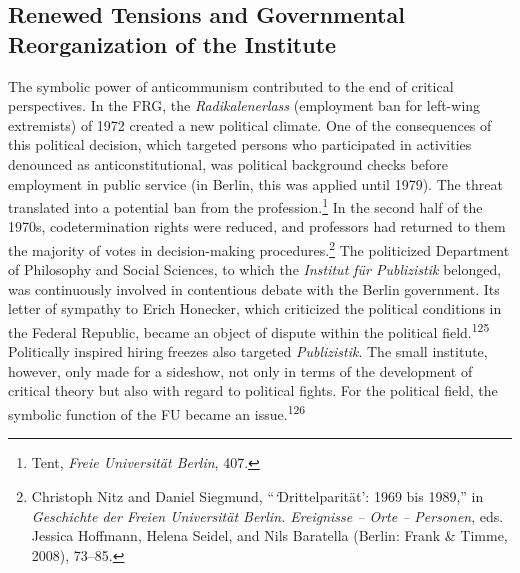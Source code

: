 \documentclass{tufte-handout}
\begin{document}
\hypertarget{renewed-tensions-and-governmental-reorganization-of-the-institute}{%
\subsection{Renewed Tensions and Governmental
Reorganization of the
Institute}\label{renewed-tensions-and-governmental-reorganization-of-the-institute}}

The symbolic power of anticommunism contributed to the end of critical
perspectives. In the FRG, the \emph{Radikalenerlass} (employment ban for
left-wing extremists) of 1972 created a new political climate. One of
the consequences of this political decision, which targeted persons who
participated in activities denounced as anticonstitutional, was
political background checks before employment in public service (in
Berlin, this was applied until 1979). The threat translated into a
potential ban from the profession.\footnote{Tent, \emph{Freie
  Universität Berlin}, 407.} In the second half of the 1970s,
codetermination rights were reduced, and professors had returned to them
the majority of votes in decision-making procedures.\footnote{Christoph
  Nitz and Daniel Siegmund, ``\emph{`}Drittelparität': 1969 bis 1989,''
  in \emph{Geschichte der Freien Universität Berlin. Ereignisse -- Orte
  -- Personen}, eds. Jessica Hoffmann, Helena Seidel, and Nils Baratella
  (Berlin: Frank \& Timme, 2008), 73--85.} The politicized Department of
Philosophy and Social Sciences, to which the \emph{Institut für
Publizistik} belonged, was continuously involved in contentious debate
with the Berlin government. Its letter of sympathy to Erich Honecker,
which criticized the political conditions in the Federal Republic,
became an object of dispute within the political field.\textsuperscript{125} Politically inspired hiring
freezes also targeted \emph{Publizistik}. The small institute, however,
only made for a sideshow, not only in terms of the development of
critical theory but also with regard to political fights. For the
political field, the symbolic function of the FU became an
issue.\textsuperscript{126}
\end{document}
